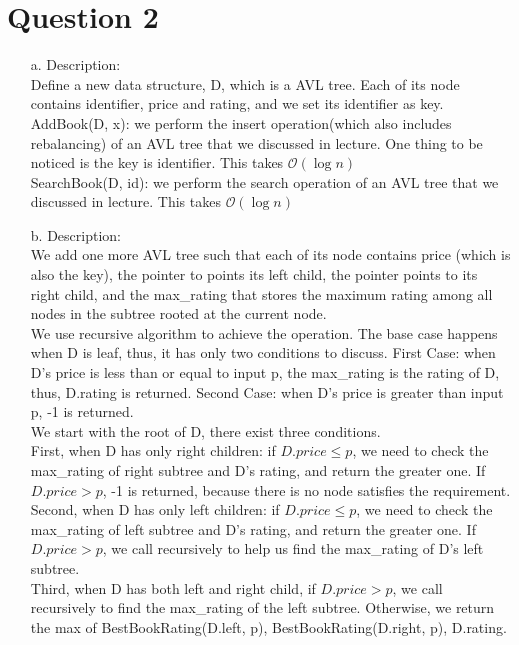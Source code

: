 \documentclass[10pt]{article}
\begin{document}
\section*{Question 2}
\begin{enumerate}
\item[a.]Description:\\
Define a new data structure, D, which is a AVL tree. Each of its node contains identifier, price and rating, and we set its identifier as key.\\
AddBook(D, x): we perform the insert operation(which also includes rebalancing) of an AVL tree that we discussed in lecture. One thing to be noticed is the key is identifier. This takes $\mathcal{O}(\log{}n)$\\
SearchBook(D, id): we perform the search operation of an AVL tree that we discussed in lecture. This takes $\mathcal{O}(\log{}n)$\\
\item[b.]
Description:\\
We add one more AVL tree such that each of its node contains price (which is also the key), the pointer to points its left child, the pointer points to its right child, and the max\_rating that stores the maximum rating among all nodes in the subtree rooted at the current node.\\
We use recursive algorithm to achieve the operation. The base case happens when D is leaf, thus, it has only two conditions to discuss. First Case: when D's price is less than or equal to input p, the max\_rating is the rating of D, thus, D.rating is returned. Second Case: when D's price is greater than input p, -1 is returned.\\
We start with the root of D, there exist three conditions.\\
First, when D has only right children: if $D.price \leq p$, we need to check the max\_rating of right subtree and D's rating, and return the greater one. If $D.price > p$, -1 is returned, because there is no node satisfies the requirement.\\Second, when D has only left children: if $D.price \leq p$, we need to check the max\_rating of left subtree and D's rating, and return the greater one. If $D.price > p$, we call recursively to help us find the max\_rating of D's left subtree.\\Third, when D has both left and right child, if $D.price > p$, we call recursively to find the max\_rating of the left subtree. Otherwise, we return the max of BestBookRating(D.left, p), BestBookRating(D.right, p), D.rating.\\

\end{enumerate}
\end{document}
